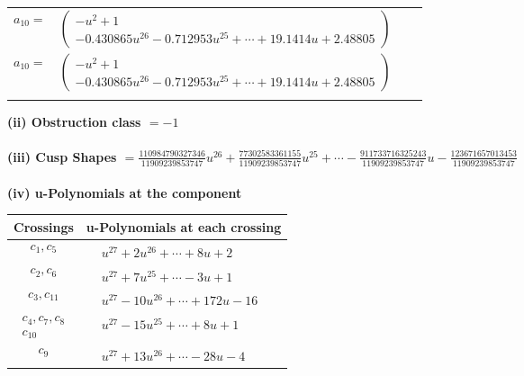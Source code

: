 \documentclass[1p]{elsarticle_modified}
\theoremstyle{definition}
\begin{document}
\begin{tabular}{m{7pt} m{180pt} m{7pt} m{180pt} }
\flushright $a_{10}=$&$\begin{pmatrix}- u^2+1\\-0.430865 u^{26}-0.712953 u^{25}+\cdots+19.1414 u+2.48805\end{pmatrix}$\\ \flushright $a_{10}=$&$\begin{pmatrix}- u^2+1\\-0.430865 u^{26}-0.712953 u^{25}+\cdots+19.1414 u+2.48805\end{pmatrix}$\\&\end{tabular}
\flushleft \textbf{(ii) Obstruction class $= -1$}\\~\\
\flushleft \textbf{(iii) Cusp Shapes $= \frac{110984790327346}{11909239853747} u^{26}+\frac{77302583361155}{11909239853747} u^{25}+\cdots-\frac{911733716325243}{11909239853747} u-\frac{123671657013453}{11909239853747}$}\\~\\
\newpage\renewcommand{\arraystretch}{1}
\flushleft \textbf{(iv) u-Polynomials at the component}\newline \\
\begin{tabular}{m{50pt}|m{274pt}}
Crossings & \hspace{64pt}u-Polynomials at each crossing \\
\hline $$\begin{aligned}c_{1},c_{5}\end{aligned}$$&$\begin{aligned}
&u^{27}+2 u^{26}+\cdots+8 u+2
\end{aligned}$\\
\hline $$\begin{aligned}c_{2},c_{6}\end{aligned}$$&$\begin{aligned}
&u^{27}+7 u^{25}+\cdots-3 u+1
\end{aligned}$\\
\hline $$\begin{aligned}c_{3},c_{11}\end{aligned}$$&$\begin{aligned}
&u^{27}-10 u^{26}+\cdots+172 u-16
\end{aligned}$\\
\hline $$\begin{aligned}c_{4},c_{7},c_{8}\\c_{10}\end{aligned}$$&$\begin{aligned}
&u^{27}-15 u^{25}+\cdots+8 u+1
\end{aligned}$\\
\hline $$\begin{aligned}c_{9}\end{aligned}$$&$\begin{aligned}
&u^{27}+13 u^{26}+\cdots-28 u-4
\end{aligned}$\\
\hline
\end{tabular}\\~\\
\end{document}
